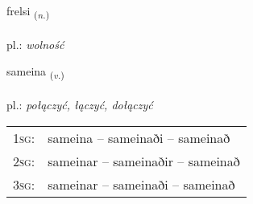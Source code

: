 \documentclass[frontgrid, backgrid]{flacards}\usepackage[]{graphicx}\usepackage[]{xcolor}
\begin{document}
\renewcommand{\flhead}{\vskip5pt \fboxsep=0pt {\small\bfseries\footnotesize Nafnorð | Noun}}
\renewcommand{\fcfoot}{\vskip5pt \fboxsep=0pt \hspace{2pt}{\small\bfseries\footnotesize 2K}}

\renewcommand{\blhead}{\vskip5pt {\small\bfseries\footnotesize Nafnorð | Noun }}
\renewcommand{\bcfoot}{\vskip5pt \hspace{2pt}{\small\bfseries\footnotesize 2K}}


{frelsi \small{\textsubscript{(\textit{n.})}} \\[1ex] %
\textphonetic{[frɛlsɪ]} \\
pl.: \emph{wolność} \\  [2ex]
\renewcommand*{\arraystretch}{0.8}
}

\renewcommand{\flhead}{\vskip5pt \fboxsep=0pt {\small\bfseries\footnotesize Sagnorð | Verb}}
\renewcommand{\fcfoot}{\vskip5pt \fboxsep=0pt \hspace{2pt}{\small\bfseries\footnotesize 2K}}

\renewcommand{\blhead}{\vskip5pt {\small\bfseries\footnotesize Sagnorð | Verb }}
\renewcommand{\bcfoot}{\vskip5pt \hspace{2pt}{\small\bfseries\footnotesize 2K}}


{sameina \small{\textsubscript{(\textit{v.})}} \\[1ex] %
\textphonetic{[saːmeina]} \\
pl.: \emph{połączyć, łączyć, dołączyć} \\  [2ex]
\renewcommand*{\arraystretch}{0.8}
\begin{tabular}{p{1cm}l}
\textsc{1sg}: & sameina -- sameinaði -- sameinað \\ 
\textsc{2sg}: & sameinar -- sameinaðir -- sameinað \\ 
\textsc{3sg}: & sameinar -- sameinaði -- sameinað \\ 
\end{tabular}
}
\end{document}

